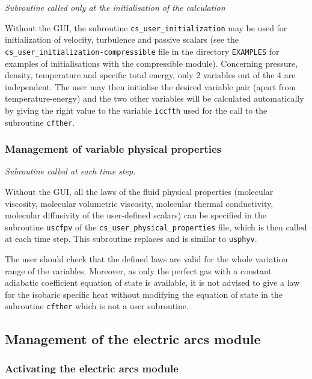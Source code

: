 {{\noindent
\textit{Subroutine called only at the initialisation of the calculation}

Without the GUI, the subroutine \texttt{cs\_user\_initialization} may be used for
 initialization of velocity, turbulence and passive scalars (see
the \texttt{cs\_user\_initialization-compressible} file in the directory \texttt{EXAMPLES}
for examples of initialisations with the compressible module). Concerning
pressure, density, temperature and specific total energy, only 2 variables out
of the 4 are independent. The user may then initialise the desired variable pair
(apart from temperature-energy) and the two other variables will be
calculated automatically by giving the right value to the variable
\texttt{iccfth} used for the call to the subroutine \texttt{cfther}.

\subsubsection{Management of variable physical properties}

\noindent
\textit{Subroutine called at each time step.}

Without the GUI, all the laws of the fluid physical properties
(molecular viscosity, molecular volumetric viscosity, molecular thermal conductivity,
molecular diffusivity of the user-defined scalars) can be specified in the subroutine \texttt{uscfpv} of
the \texttt{cs\_user\_physical\_properties} file,
 which is then called at each time step. This subroutine replaces and is similar to \texttt{usphyv}.

The user should check that the defined laws are valid for
the whole variation range of the variables. Moreover, as only the perfect gas with a constant
adiabatic coefficient equation of state is available, it is not advised to give a law for the isobaric
specific heat without modifying the equation of state in the subroutine \texttt{cfther} which is not
a user subroutine.

\subsection{Management of the electric arcs module}

\subsubsection{Activating the electric arcs module}\label{sec:acti-lag}

}}
